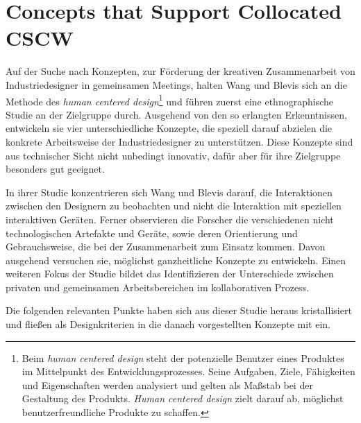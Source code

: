 \section{Concepts that Support Collocated CSCW}
Auf der Suche nach Konzepten, zur Förderung der kreativen Zusammenarbeit von Industriedesigner in gemeinsamen Meetings, halten Wang und Blevis \citep{Wang:2004p110} sich an die Methode des \emph{human centered design}\footnote{Beim \emph{human centered design} steht der potenzielle Benutzer eines Produktes im Mittelpunkt des Entwicklungsprozesses. Seine Aufgaben, Ziele, Fähigkeiten und Eigenschaften werden analysiert und gelten als Maßstab bei der Gestaltung des Produkts. \emph{Human centered design} zielt darauf ab, möglichst benutzerfreundliche Produkte zu schaffen.} und führen zuerst eine ethnographische Studie an der Zielgruppe durch. Ausgehend von den so erlangten Erkenntnissen, entwickeln sie vier unterschiedliche Konzepte, die speziell darauf abzielen die konkrete Arbeitsweise der Industriedesigner zu unterstützen. Diese Konzepte sind aus technischer Sicht nicht unbedingt innovativ, dafür aber für ihre Zielgruppe besonders gut geeignet.

In ihrer Studie konzentrieren sich Wang und Blevis \citep{Wang:2004p110} darauf, die Interaktionen zwischen den Designern zu beobachten und nicht die Interaktion mit speziellen interaktiven Geräten. Ferner observieren die Forscher die verschiedenen nicht technologischen Artefakte und Geräte, sowie deren Orientierung und Gebrauchsweise, die bei der Zusammenarbeit zum Einsatz kommen. Davon ausgehend versuchen sie, möglichst ganzheitliche Konzepte zu entwickeln. Einen weiteren Fokus der Studie bildet das Identifizieren der Unterschiede zwischen privaten und gemeinsamen Arbeitsbereichen im kollaborativen Prozess.

Die folgenden relevanten Punkte haben sich aus dieser Studie heraus kristallisiert und fließen als Designkriterien in die danach vorgestellten Konzepte mit ein.

